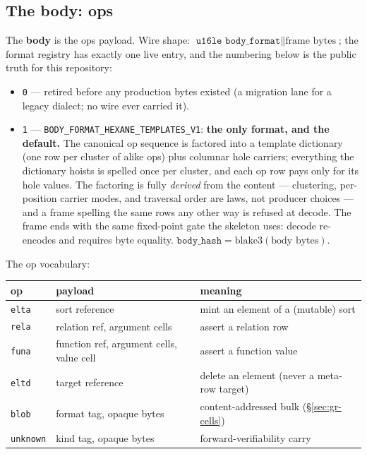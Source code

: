 \subsection{The body: ops}
\label{sec:gr-body}

The \textbf{body} is the ops payload. Wire shape:
$\texttt{u16le body\_format} \parallel \text{frame bytes}$; the
format registry has exactly one live entry, and the numbering below
is the public truth for this repository:

\begin{itemize}
\item \texttt{0} — retired before any production bytes existed (a
migration lane for a legacy dialect; no wire ever carried it).
\item \texttt{1} — \texttt{BODY\_FORMAT\_HEXANE\_TEMPLATES\_V1}:
\textbf{the only format, and the default.} The canonical op sequence
is factored into a template dictionary (one row per cluster of alike
ops) plus columnar hole carriers; everything the dictionary hoists is
spelled once per cluster, and each op row pays only for its hole
values. The factoring is fully \emph{derived} from the content —
clustering, per-position carrier modes, and traversal order are laws,
not producer choices — and a frame spelling the same rows any other
way is refused at decode. The frame ends with the same fixed-point
gate the skeleton uses: decode re-encodes and requires byte equality.
$\texttt{body\_hash} = \mathrm{blake3}(\text{body bytes})$.
\end{itemize}

\noindent The op vocabulary:

\begin{center}
\small
\begin{tabular}{lll}
\toprule
op & payload & meaning \\
\midrule
\texttt{elta} & sort reference & mint an element of a (mutable) sort \\
\texttt{rela} & relation ref, argument cells & assert a relation row \\
\texttt{funa} & function ref, argument cells, value cell & assert a function value \\
\texttt{eltd} & target reference & delete an element (never a meta-row target) \\
\texttt{blob} & format tag, opaque bytes & content-addressed bulk (\S\ref{sec:gr-cells}) \\
\texttt{unknown} & kind tag, opaque bytes & forward-verifiability carry \\
\bottomrule
\end{tabular}
\end{center}

